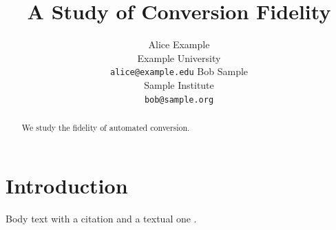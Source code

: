 \documentclass{article}
\title{A Study of Conversion Fidelity}
\author{Alice Example \\ Example University \\ \texttt{alice@example.edu} \And Bob Sample \\ Sample Institute \\ \texttt{bob@sample.org}}
\begin{document}
\maketitle
\begin{abstract}
We study the fidelity of automated conversion.
\end{abstract}
\section{Introduction}
Body text with a citation \citep{knuth1984} and a textual one \citet{lamport1994}.


\end{document}
